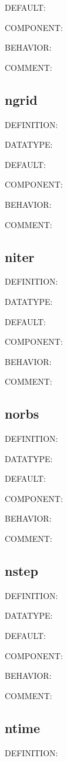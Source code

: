{\color{blue}DEFAULT:}

{\color{brown}COMPONENT:}

{\color{purple}BEHAVIOR:}

{\color{olive}COMMENT:}

\subsection{ngrid}
{\color{red}DEFINITION:}

{\color{green}DATATYPE:}

{\color{blue}DEFAULT:}

{\color{brown}COMPONENT:}

{\color{purple}BEHAVIOR:}

{\color{olive}COMMENT:}

\subsection{niter}
{\color{red}DEFINITION:}

{\color{green}DATATYPE:}

{\color{blue}DEFAULT:}

{\color{brown}COMPONENT:}

{\color{purple}BEHAVIOR:}

{\color{olive}COMMENT:}

\subsection{norbs}
{\color{red}DEFINITION:}

{\color{green}DATATYPE:}

{\color{blue}DEFAULT:}

{\color{brown}COMPONENT:}

{\color{purple}BEHAVIOR:}

{\color{olive}COMMENT:}

\subsection{nstep}
{\color{red}DEFINITION:}

{\color{green}DATATYPE:}

{\color{blue}DEFAULT:}

{\color{brown}COMPONENT:}

{\color{purple}BEHAVIOR:}

{\color{olive}COMMENT:}

\subsection{ntime}
{\color{red}DEFINITION:}

